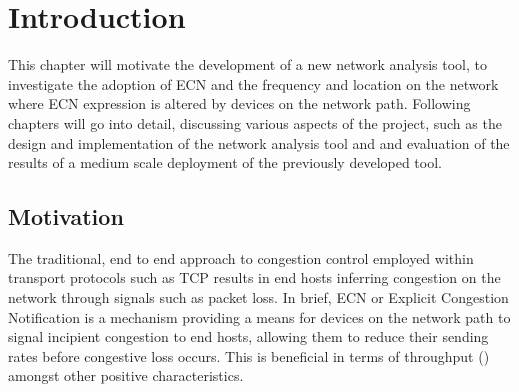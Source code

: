 \documentclass{l4proj}
\begin{document}
%
%
%
%
%
%
%
\chapter{Introduction}
\label{chap:introduction}


This chapter will motivate the development of a new network analysis tool, to investigate the adoption of ECN and the frequency and location on the network where ECN expression is altered by devices on the network path. Following chapters will go into detail, discussing various aspects of the project, such as the design and implementation of the network analysis tool and and evaluation of the results of a medium scale deployment of the previously developed tool.

\section{Motivation}

The traditional, end to end approach to congestion control employed within transport protocols such as TCP results in end hosts inferring congestion on the network through signals such as packet loss. In brief, ECN or Explicit Congestion Notification is a mechanism providing a means for devices on the network path to signal incipient congestion to end hosts, allowing them to reduce their sending rates before congestive loss occurs. This is beneficial in terms of throughput (\cite{fairhurst_benefits_2017}) amongst other positive characteristics. 
\end{document}

